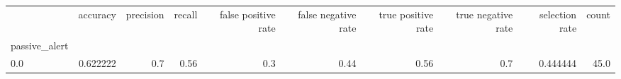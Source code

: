 \begin{tabular}{lrrrrrrrrr}
\toprule
{} &  accuracy &  precision &  recall &  false positive rate &  false negative rate &  true positive rate &  true negative rate &  selection rate &  count \\
passive\_alert &           &            &         &                      &                      &                     &                     &                 &        \\
\midrule
0.0           &  0.622222 &        0.7 &    0.56 &                  0.3 &                 0.44 &                0.56 &                 0.7 &        0.444444 &   45.0 \\
\bottomrule
\end{tabular}
